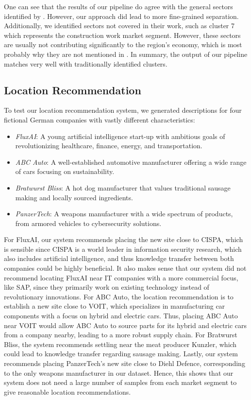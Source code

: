 \documentclass[conference]{IEEEtran}
\begin{document}
One can see that the results of our pipeline do agree with the general sectors identified by \cite{saarlandeco2}. However, our approach did lead to more fine-grained separation. Additionally, we identified sectors not covered in their work, such as cluster 7 which represents the construction work market segment. However, these sectors are usually not contributing significantly to the region's economy, which is most probably why they are not mentioned in \cite{saarlandeco2}. In summary, the output of our pipeline matches very well with traditionally identified clusters.

\subsection{Location Recommendation}
To test our location recommendation system, we generated descriptions for four fictional German companies with vastly different characteristics:
\begin{itemize}
    \item \textit{FluxAI}: A young artificial intelligence start-up with ambitious goals of revolutionizing healthcare, finance, energy, and transportation.
    \item \textit{ABC Auto}: A well-established automotive manufacturer offering a wide range of cars focusing on sustainability.
    \item \textit{Bratwurst Bliss}: A hot dog manufacturer that values traditional sausage making and locally sourced ingredients.
    \item \textit{PanzerTech}: A weapons manufacturer with a wide spectrum of products, from armored vehicles to cybersecurity solutions.
\end{itemize}

For FluxAI, our system recommends placing the new site close to CISPA, which is sensible since CISPA is a world leader in information security research, which also includes artificial intelligence, and thus knowledge transfer between both companies could be highly beneficial. It also makes sense that our system did not recommend locating FluxAI near IT companies with a more commercial focus, like SAP, since they primarily work on existing technology instead of revolutionary innovations.
For ABC Auto, the location recommendation is to establish a new site close to VOIT, which specializes in manufacturing car components with a focus on hybrid and electric cars. Thus, placing ABC Auto near VOIT would allow ABC Auto to source parts for its hybrid and electric cars from a company nearby, leading to a more robust supply chain.
For Bratwurst Bliss, the system recommends settling near the meat producer Kunzler, which could lead to knowledge transfer regarding sausage making.
Lastly, our system recommends placing PanzerTech's new site close to Diehl Defence, corresponding to the only weapons manufacturer in our dataset. Hence, this shows that our system does not need a large number of samples from each market segment to give reasonable location recommendations.
\end{document}
